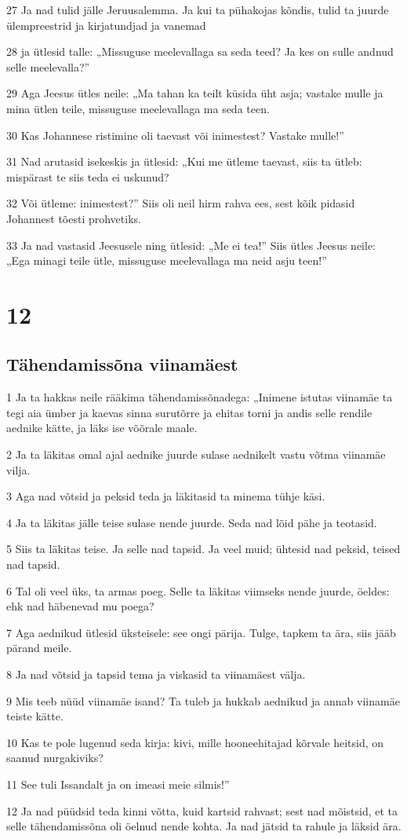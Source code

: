 \par 27 Ja nad tulid jälle Jeruusalemma. Ja kui ta pühakojas kõndis, tulid ta juurde ülempreestrid ja kirjatundjad ja vanemad
\par 28 ja ütlesid talle: „Missuguse meelevallaga sa seda teed? Ja kes on sulle andnud selle meelevalla?”
\par 29 Aga Jeesus ütles neile: „Ma tahan ka teilt küsida üht asja; vastake mulle ja mina ütlen teile, missuguse meelevallaga ma seda teen.
\par 30 Kas Johannese ristimine oli taevast või inimestest? Vastake mulle!”
\par 31 Nad arutasid isekeskis ja ütlesid: „Kui me ütleme taevast, siis ta ütleb: mispärast te siis teda ei uskunud?
\par 32 Või ütleme: inimestest?” Siis oli neil hirm rahva ees, sest kõik pidasid Johannest tõesti prohvetiks.
\par 33 Ja nad vastasid Jeesusele ning ütlesid: „Me ei tea!” Siis ütles Jeesus neile: „Ega minagi teile ütle, missuguse meelevallaga ma neid asju teen!”


\chapter{12}

\section*{Tähendamissõna viinamäest}

\par 1 Ja ta hakkas neile rääkima tähendamissõnadega: „Inimene istutas viinamäe ta tegi aia ümber ja kaevas sinna surutõrre ja ehitas torni ja andis selle rendile aednike kätte, ja läks ise võõrale maale.
\par 2 Ja ta läkitas omal ajal aednike juurde sulase aednikelt vastu võtma viinamäe vilja.
\par 3 Aga nad võtsid ja peksid teda ja läkitasid ta minema tühje käsi.
\par 4 Ja ta läkitas jälle teise sulase nende juurde. Seda nad lõid pähe ja teotasid.
\par 5 Siis ta läkitas teise. Ja selle nad tapsid. Ja veel muid; ühtesid nad peksid, teised nad tapsid.
\par 6 Tal oli veel üks, ta armas poeg. Selle ta läkitas viimseks nende juurde, öeldes: ehk nad häbenevad mu poega?
\par 7 Aga aednikud ütlesid üksteisele: see ongi pärija. Tulge, tapkem ta ära, siis jääb pärand meile.
\par 8 Ja nad võtsid ja tapsid tema ja viskasid ta viinamäest välja.
\par 9 Mis teeb nüüd viinamäe isand? Ta tuleb ja hukkab aednikud ja annab viinamäe teiste kätte.
\par 10 Kas te pole lugenud seda kirja: kivi, mille hooneehitajad kõrvale heitsid, on saanud nurgakiviks?
\par 11 See tuli Issandalt ja on imeasi meie silmis!”
\par 12 Ja nad püüdsid teda kinni võtta, kuid kartsid rahvast; sest nad mõistsid, et ta selle tähendamissõna oli öelnud nende kohta. Ja nad jätsid ta rahule ja läksid ära.

